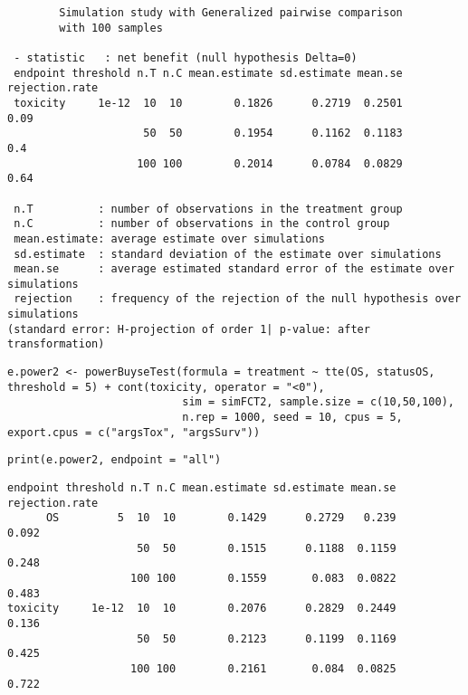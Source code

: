 \documentclass[12pt]{article}
\begin{document}
\begin{verbatim}
        Simulation study with Generalized pairwise comparison
        with 100 samples

 - statistic   : net benefit (null hypothesis Delta=0)
 endpoint threshold n.T n.C mean.estimate sd.estimate mean.se rejection.rate
 toxicity     1e-12  10  10        0.1826      0.2719  0.2501           0.09
                     50  50        0.1954      0.1162  0.1183            0.4
                    100 100        0.2014      0.0784  0.0829           0.64

 n.T          : number of observations in the treatment group
 n.C          : number of observations in the control group
 mean.estimate: average estimate over simulations
 sd.estimate  : standard deviation of the estimate over simulations
 mean.se      : average estimated standard error of the estimate over simulations
 rejection    : frequency of the rejection of the null hypothesis over simulations
(standard error: H-projection of order 1| p-value: after transformation)
\end{verbatim}


\lstset{language=r,label= ,caption= ,captionpos=b,numbers=none}
\begin{lstlisting}
e.power2 <- powerBuyseTest(formula = treatment ~ tte(OS, statusOS, threshold = 5) + cont(toxicity, operator = "<0"),
                           sim = simFCT2, sample.size = c(10,50,100),
                           n.rep = 1000, seed = 10, cpus = 5, export.cpus = c("argsTox", "argsSurv"))
\end{lstlisting}

\lstset{language=r,label= ,caption= ,captionpos=b,numbers=none}
\begin{lstlisting}
print(e.power2, endpoint = "all")
\end{lstlisting}

\begin{verbatim}
endpoint threshold n.T n.C mean.estimate sd.estimate mean.se rejection.rate
      OS         5  10  10        0.1429      0.2729   0.239          0.092
                    50  50        0.1515      0.1188  0.1159          0.248
                   100 100        0.1559       0.083  0.0822          0.483
toxicity     1e-12  10  10        0.2076      0.2829  0.2449          0.136
                    50  50        0.2123      0.1199  0.1169          0.425
                   100 100        0.2161       0.084  0.0825          0.722
\end{verbatim}
\end{document}
